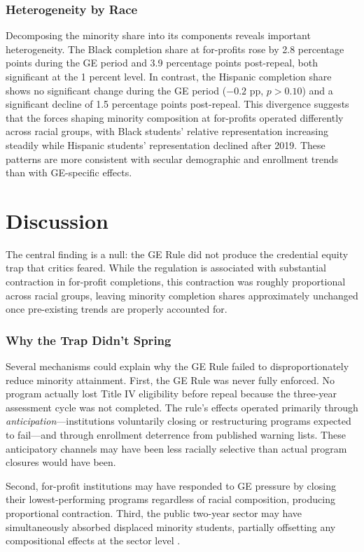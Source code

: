 \documentclass[12pt]{article}
\begin{document}
\subsubsection*{Heterogeneity by Race} Decomposing the minority share into its components reveals important heterogeneity. The Black completion share at for-profits rose by 2.8 percentage points during the GE period and 3.9 percentage points post-repeal, both significant at the 1 percent level. In contrast, the Hispanic completion share shows no significant change during the GE period ($-0.2$ pp, $p > 0.10$) and a significant decline of 1.5 percentage points post-repeal. This divergence suggests that the forces shaping minority composition at for-profits operated differently across racial groups, with Black students' relative representation increasing steadily while Hispanic students' representation declined after 2019. These patterns are more consistent with secular demographic and enrollment trends than with GE-specific effects.


\section{Discussion}

The central finding is a null: the GE Rule did not produce the credential equity trap that critics feared. While the regulation is associated with substantial contraction in for-profit completions, this contraction was roughly proportional across racial groups, leaving minority completion shares approximately unchanged once pre-existing trends are properly accounted for.

\subsubsection*{Why the Trap Didn't Spring} Several mechanisms could explain why the GE Rule failed to disproportionately reduce minority attainment. First, the GE Rule was never fully enforced. No program actually lost Title IV eligibility before repeal because the three-year assessment cycle was not completed. The rule's effects operated primarily through \textit{anticipation}---institutions voluntarily closing or restructuring programs expected to fail---and through enrollment deterrence from published warning lists. These anticipatory channels may have been less racially selective than actual program closures would have been.

Second, for-profit institutions may have responded to GE pressure by closing their lowest-performing programs regardless of racial composition, producing proportional contraction. Third, the public two-year sector may have simultaneously absorbed displaced minority students, partially offsetting any compositional effects at the sector level \citep{Cellini2020, JepsenMueserTroske2014}.
\end{document}
